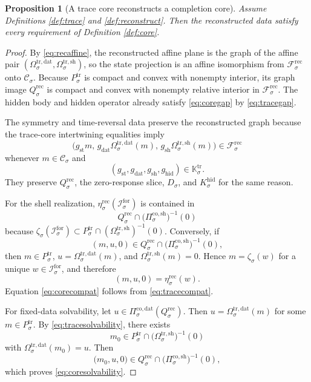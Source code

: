 \documentclass[11pt]{article}
\newcommand{\ForSpace}[1]{\mathcal I_{#1}^{\mathrm{for}}}
\newcommand{\CoreState}[1]{\mathcal C_{#1}}
\newcommand{\CoreDataProj}[1]{\Pi_{#1}^{\mathrm{co,dat}}}
\newcommand{\CoreShellProj}[1]{\Pi_{#1}^{\mathrm{co,sh}}}
\newcommand{\GapBody}[1]{D_{#1}}
\newcommand{\HiddenOperator}[1]{K_{#1}^{\mathrm{hid}}}
\newcommand{\TraceBody}[1]{P_{#1}^{\mathrm{tr}}}
\newcommand{\TraceDataMap}[1]{\Omega_{#1}^{\mathrm{tr,dat}}}
\newcommand{\TraceShellMap}[1]{\Omega_{#1}^{\mathrm{tr,sh}}}
\newcommand{\TraceSym}[1]{\mathbb K_{#1}^{\mathrm{tr}}}
\newcommand{\TraceEmbed}[1]{\zeta_{#1}}
\newcommand{\RecAffine}[1]{\mathcal F_{#1}^{\mathrm{rec}}}
\newcommand{\RecBody}[1]{Q_{#1}^{\mathrm{rec}}}
\newcommand{\RecEmbed}[1]{\eta_{#1}^{\mathrm{rec}}}
\newtheorem{proposition}{Proposition}
\begin{document}
\begin{proposition}[A trace core reconstructs a completion core]
\label{prop:reconstruct}
Assume Definitions \ref{def:trace} and \ref{def:reconstruct}. Then the reconstructed data satisfy every requirement of Definition \ref{def:core}.
\end{proposition}

\begin{proof}
By \eqref{eq:recaffine}, the reconstructed affine plane is the graph of the affine pair \((\TraceDataMap{\sigma},\TraceShellMap{\sigma})\), so the state projection is an affine isomorphism from \(\RecAffine{\sigma}\) onto \(\CoreState{\sigma}\). Because \(\TraceBody{\sigma}\) is compact and convex with nonempty interior, its graph image \(\RecBody{\sigma}\) is compact and convex with nonempty relative interior in \(\RecAffine{\sigma}\). The hidden body and hidden operator already satisfy \eqref{eq:coregap} by \eqref{eq:tracegap}.

The symmetry and time-reversal data preserve the reconstructed graph because the trace-core intertwining equalities imply
\[
\bigl(
g_{\mathrm{st}}m,\,
g_{\mathrm{dat}}\TraceDataMap{\sigma}(m),\,
g_{\mathrm{sh}}\TraceShellMap{\sigma}(m)
\bigr)
\in\RecAffine{\sigma}
\]
whenever \(m\in\CoreState{\sigma}\) and
\[
(g_{\mathrm{st}},g_{\mathrm{dat}},g_{\mathrm{sh}},g_{\mathrm{hid}})
\in\TraceSym{\sigma}.
\]
They preserve \(\RecBody{\sigma}\), the zero-response slice, \(\GapBody{\sigma}\), and \(\HiddenOperator{\sigma}\) for the same reason.

For the shell realization, \(\RecEmbed{\sigma}(\ForSpace{\sigma})\) is contained in
\[
\RecBody{\sigma}\cap
\bigl(\CoreShellProj{\sigma}\bigr)^{-1}(0)
\]
because \(\TraceEmbed{\sigma}(\ForSpace{\sigma})\subset\TraceBody{\sigma}\cap(\TraceShellMap{\sigma})^{-1}(0)\). Conversely, if
\[
(m,u,0)\in
\RecBody{\sigma}\cap
\bigl(\CoreShellProj{\sigma}\bigr)^{-1}(0),
\]
then \(m\in\TraceBody{\sigma}\), \(u=\TraceDataMap{\sigma}(m)\), and \(\TraceShellMap{\sigma}(m)=0\). Hence \(m=\TraceEmbed{\sigma}(w)\) for a unique \(w\in\ForSpace{\sigma}\), and therefore
\[
(m,u,0)=\RecEmbed{\sigma}(w).
\]
Equation \eqref{eq:corecompat} follows from \eqref{eq:tracecompat}.

For fixed-data solvability, let \(u\in\CoreDataProj{\sigma}(\RecBody{\sigma})\). Then \(u=\TraceDataMap{\sigma}(m)\) for some \(m\in\TraceBody{\sigma}\). By \eqref{eq:tracesolvability}, there exists
\[
m_{0}\in\TraceBody{\sigma}\cap
\bigl(\TraceShellMap{\sigma}\bigr)^{-1}(0)
\]
with \(\TraceDataMap{\sigma}(m_{0})=u\). Then
\[
\bigl(
m_{0},u,0
\bigr)
\in
\RecBody{\sigma}\cap
\bigl(\CoreShellProj{\sigma}\bigr)^{-1}(0),
\]
which proves \eqref{eq:coresolvability}.


\end{proof}
\end{document}
